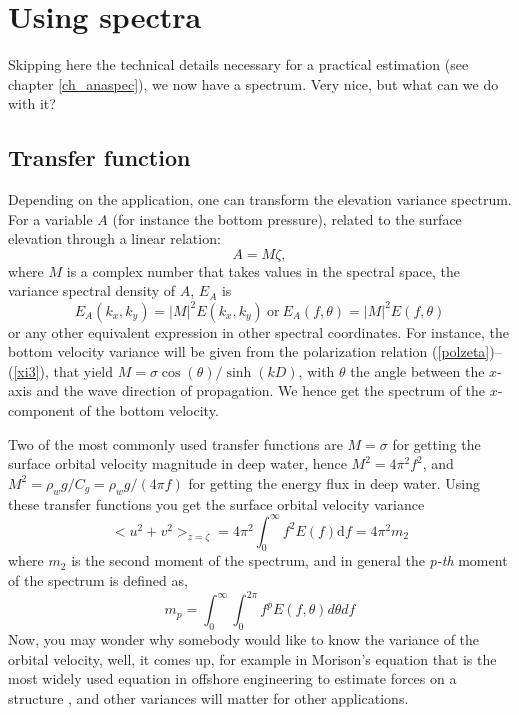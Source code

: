 \section{Using spectra}
Skipping here the technical details necessary for a practical estimation (see chapter \ref{ch_anaspec}), we now have a spectrum. Very nice, but what 
can we do with it? 

\subsection{Transfer function}\label{sub:transfer}
Depending on the application, one can transform the elevation variance spectrum. For a variable $A$ (for instance the bottom pressure), related to the  
surface elevation through a linear relation:
\begin{equation}
A=M\zeta,
\label{eq3.12}
\end{equation}
where $M$ is a complex number that takes values in the spectral space, the variance spectral density of $A$, $E_A$ is 
\begin{equation}
E_{A}(k_{x},k_{y})=|M|^{2}E(k_{x},k_{y})~\mathrm{or}~ E_{A}(f,\theta)=|M|^{2}E(f,\theta)
\label{eq:transfert}
\end{equation}
or any other equivalent expression in other spectral coordinates. For instance, the bottom velocity variance will be given from the polarization relation (\ref{polzeta})--(\ref{xi3}), that yield 
$M=\sigma \cos(\theta)/\sinh(kD)$, with $\theta$ the angle between the $x$-axis and the wave direction of propagation. We hence 
get the spectrum of the $x$-component of the bottom velocity.

Two of the most commonly used transfer functions are $M=\sigma$ for getting the surface orbital velocity magnitude in deep water, hence $M^2=4\pi^2 f^2$, and $M^2=\rho_w g/C_g=\rho_w g/(4 \pi f)$ for getting the energy flux in deep water. Using these transfer functions you get the surface orbital velocity variance 
\begin{equation}
<u^2+v^2>_{z=\overline{\zeta}}   =4\pi^2  \int_{0}^{\infty}  f^{2} E(f) {\mathrm d}f = 4\pi^2 m_2
\label{eq:moment_def}
\end{equation}
where $m_2$ is the second moment of the spectrum, and in general the  \textit{p-th} moment of the spectrum is defined as,
\begin{equation}
m_{p} = \int_{0}^{\infty}\int_{0}^{2\pi} f^{p} E(f,\theta)d\theta df
\label{eq:moment_def}
\end{equation}
Now, you may wonder why somebody would like to know the variance of the orbital velocity, well, it comes up, for example in Morison's equation that is the most widely used equation in offshore engineering to estimate forces on a structure \citep{Boccotti2000}, and other variances will matter for other applications. 

